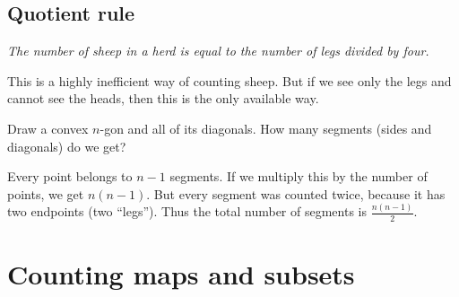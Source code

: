 \begin{page}
\setcounter{section}{1}
\setcounter{subsection}{4}
\setcounter{dfn}{3}
\label{portion:21}

\subsection{Quotient rule}
\begin{center}
\parbox{.9\textwidth}{\emph{The number of sheep in a herd is equal to the number of legs divided by four.}}
\end{center}
This is a highly inefficient way of counting sheep.
But if we see only the legs and cannot see the heads, then this is the only available way.


\end{page}

\begin{page}
\setcounter{section}{1}
\setcounter{subsection}{4}
\setcounter{dfn}{4}
\label{portion:23}

\begin{exl}
Draw a convex $n$-gon and all of its diagonals.
How many segments (sides and diagonals) do we get?

Every point belongs to $n-1$ segments.
If we multiply this by the number of points, we get $n(n-1)$.
But every segment was counted twice, because it has two endpoints (two ``legs'').
Thus the total number of segments is $\frac{n(n-1)}2$.
\end{exl}

\end{page}

\begin{page}
\setcounter{section}{2}
\setcounter{subsection}{1}
\setcounter{dfn}{0}
\label{portion:26}

\section{Counting maps and subsets}

\end{page}

